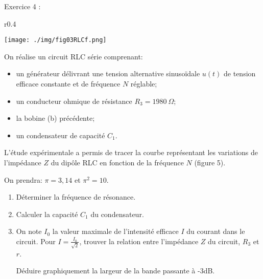 \documentclass[12pt, french]{article}
\begin{document}
\begin{Box2}{Exercice 4 : }

   \begin{wrapfigure}[10]{r}{0.4\textwidth}
  \begin{center}
	  \vspace{-0.8cm}
	\texttt{[image: ./img/fig03RLCf.png]}
  \end{center}
\end{wrapfigure}

On réalise un circuit RLC série comprenant:
\begin{itemize}
    \item un générateur délivrant une tension alternative sinusoïdale $u(t)$ de tension efficace constante et de fréquence $N$ réglable;
    \item un conducteur ohmique de résistance $R_3 = 1980\:\Omega$;
    \item la bobine (b) précédente;
    \item un condensateur de capacité $C_1$.
\end{itemize}

L'étude expérimentale a permis de tracer la courbe représentant les variations de l'impédance $Z$ du dipôle RLC en fonction de la fréquence $N$ (figure 5).

On prendra: $\pi = 3,14$ et $\pi^2 = 10$.

\begin{enumerate}
    \item Déterminer la fréquence de résonance.
    
    \item Calculer la capacité $C_1$ du condensateur.
    
    \item On note $I_0$ la valeur maximale de l'intensité efficace $I$ du courant dans le circuit. Pour $I = \frac{I_0}{\sqrt{2}}$, trouver la relation entre l'impédance $Z$ du circuit, $R_3$ et $r$.
    
    Déduire graphiquement la largeur de la bande passante à -3dB.
\end{enumerate}



\end{Box2}
\end{document}
